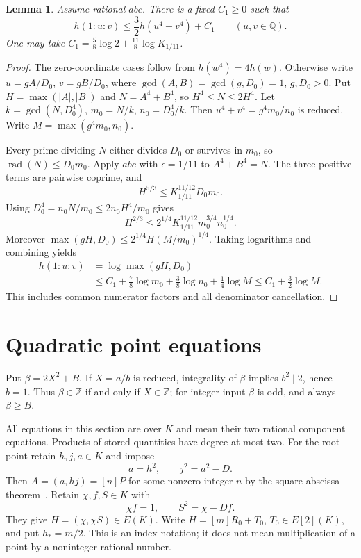 \documentclass[11pt,a4paper]{article}
\newtheorem{lemma}[theorem]{Lemma}
\newcommand{\Q}{\mathbb Q}\newcommand{\Z}{\mathbb Z}
\DeclareMathOperator{\rad}{rad}
\begin{document}
\begin{lemma}\label{lem:pair}
Assume rational $abc$. There is a fixed $C_1\ge0$ such that
\[
                    h(1:u:v)\le\frac32h(u^4+v^4)+C_1
                    \qquad(u,v\in\Q).
\]
One may take $C_1=\frac58\log2+\frac{11}{8}\log K_{1/11}$.
\end{lemma}
\begin{proof}
The zero-coordinate cases follow from $h(w^4)=4h(w)$.
Otherwise write $u=gA/D_0$, $v=gB/D_0$, where
$\gcd(A,B)=\gcd(g,D_0)=1$, $g,D_0>0$. Put
$H=\max(|A|,|B|)$ and $N=A^4+B^4$, so $H^4\le N\le2H^4$.
Let $k=\gcd(N,D_0^4)$, $m_0=N/k$, $n_0=D_0^4/k$.
Then $u^4+v^4=g^4m_0/n_0$ is reduced. Write
$M=\max(g^4m_0,n_0)$.

Every prime dividing $N$ either divides $D_0$ or survives in $m_0$,
so $\rad(N)\le D_0m_0$. Apply $abc$ with $\epsilon=1/11$ to
$A^4+B^4=N$. The three positive terms are pairwise coprime, and
\[
 H^{5/3}\le K_{1/11}^{11/12}D_0m_0.
\]
Using $D_0^4=n_0N/m_0\le2n_0H^4/m_0$ gives
\[
 H^{2/3}\le2^{1/4}K_{1/11}^{11/12}m_0^{3/4}n_0^{1/4}.
\]
Moreover $\max(gH,D_0)\le2^{1/4}H(M/m_0)^{1/4}$.
Taking logarithms and combining yields
\[
 \begin{split}
 h(1:u:v)&=\log\max(gH,D_0)\\
 &\le C_1+\frac78\log m_0+\frac38\log n_0+\frac14\log M
 \le C_1+\frac32\log M.
 \end{split}
\]
This includes common numerator factors and all denominator cancellation.
\end{proof}

\section{Quadratic point equations}

Put $\beta=2X^2+B$. If $X=a/b$ is reduced, integrality of $\beta$
implies $b^2\mid2$, hence $b=1$. Thus $\beta\in\Z$ if and only if
$X\in\Z$; for integer input $\beta$ is odd, and always $\beta\ge B$.

All equations in this section are over $K$ and mean their two rational
component equations. Products of stored quantities have degree at most two.
For the root point retain $h,j,a\in K$ and impose
\begin{equation}\label{eq:root}
                       a=h^2,\qquad j^2=a^2-D.
\end{equation}
Then $A=(a,hj)=[n]P$ for some nonzero integer $n$ by the
square-abscissa theorem~\cite{Squares}. Retain $\chi,f,S\in K$ with
\begin{equation}\label{eq:H}
                    \chi f=1,\qquad S^2=\chi-Df.
\end{equation}
They give $H=(\chi,\chi S)\in E(K)$. Write
$H=[m]R_0+T_0$, $T_0\in E[2](K)$, and put $h_*=m/2$.
This is an index notation; it does not mean multiplication of a point
by a noninteger rational number.
\end{document}
